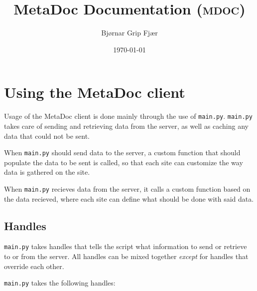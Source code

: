 \documentclass[titlepage, a4paper,10pt]{article}
\title{MetaDoc Documentation (\textsc{mdoc})}
\author{Bjørnar Grip Fjær}
\date{\today}
\begin{document}
\maketitle

\tableofcontents
\newpage

\section{Using the MetaDoc client}
Usage of the MetaDoc client is done mainly through the use of \texttt{main.py}.
\texttt{main.py} takes care of sending and retrieving data from the server, as
well as caching any data that could not be sent. 

When \texttt{main.py} should send data to the server, a custom function that
should populate the data to be sent is called, so that each site can customize
the way data is gathered on the site. 

When \texttt{main.py} recieves data from the server, it calls a custom function
based on the data recieved, where each site can define what should be done with
said data.

\subsection{Handles}
\label{sec:handles}
\texttt{main.py} takes handles that tells the script what information to send
or retrieve to or from the server. All handles can be mixed together
\textit{except} for handles that override each other.

\texttt{main.py} takes the following handles:
\end{document}
